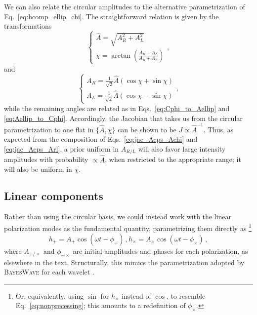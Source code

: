 \documentclass[aps,prd,twocolumn,superscriptaddress,preprintnumbers,floatfix,nofootinbib]{revtex4-2}
\newcommand*{\eq}[1]{Eq.~\eqref{eq:#1}}
\begin{document}
We can also relate the circular amplitudes to the alternative parametrization of \eq{hcomp_ellip_chi}.
The straightforward relation is given by the transformations
\begin{equation} \label{eq:Cphi_to_Ahatchi}
\begin{cases}
\hat{A} = \sqrt{A_R^2 + A_L^2} \\
\chi = \arctan\left( \frac{A_R - A_L}{A_R + A_L}\right)
\end{cases} ,
\end{equation}
and
\begin{equation} \label{eq:Cphi_to_Ahatchi}
\begin{cases}
A_R = \frac{1}{\sqrt{2}} \hat{A} \left(\cos\chi + \sin \chi\right) \\
A_L = \frac{1}{\sqrt{2}} \hat{A} \left(\cos\chi - \sin \chi\right)
\end{cases} ,
\end{equation}
while the remaining angles are related as in Eqs.~\eqref{eq:Cphi_to_Aellip} and \eqref{eq:Aellip_to_Cphi}.
Accordingly, the Jacobian that takes us from the circular parametrization to one flat in $\{\hat{A},\chi\}$ can be shown to be $J \propto \hat{A}^{-1}$.
Thus, as expected from the composition of Eqs.~\eqref{eq:jac_Aeps_Achi} and \eqref{eq:jac_Aeps_Arl}, a prior uniform in $A_{R/L}$ will also favor large intensity amplitudes with probability $\propto \hat{A}$, when restricted to the appropriate range; it will also be uniform in $\chi$.


\subsection{Linear components}
\label{sec:jac:Apc}

Rather than using the circular basis, we could instead work with the linear polarization modes as the fundamental quantity, parametrizing them directly as%
\footnote{Or, equivalently, using $\sin$ for $h_\times$ instead of $\cos$, to resemble \eq{nonprecessing}; this amounts to a redefinition of $\phi_\times$.}
\begin{subequations} \label{eq:Aphi}
\begin{equation}
h_+ = A_+ \cos (\omega t - \phi_+)\, ,
\end{equation}
\begin{equation}
h_\times = A_\times \cos (\omega t - \phi_\times) \, ,
\end{equation}
\end{subequations}
where $A_{+/\times}$ and $\phi_{+\times}$ are initial amplitudes and phases for each polarization, as elsewhere in the text.
Structurally, this mimics the parametrization adopted by \textsc{BayesWave} for each wavelet \cite{Cornish:2020dwh}.
\end{document}
